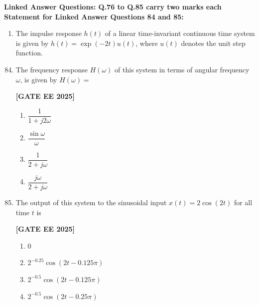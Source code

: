 \documentclass[12pt]{article}
\begin{document}
\vspace{1em}
 \large \textbf {Linked Answer Questions: Q.76 to Q.85 carry two marks each}
 \large \textbf {Statement for Linked Answer Questions 84 and 85: }
\vspace{1em}
\begin{enumerate}
\item The impulse response $h(t)$ of a linear time-invariant continuous time system is given by
$h(t) = \exp(-2 t) u(t)$, where $u(t)$ denotes the unit step function.
\end{enumerate}
\begin{enumerate}[leftmargin=*, label=\textbf{Q.\arabic*:}]
\setcounter{enumi}{83}

\item The frequency response $H(\omega)$ of this system in terms of angular frequency $\omega$, is given by $H(\omega) = $
 
\noindent \textbf{[GATE EE 2025]}
\begin{enumerate}[label=(\Alph*)]
  \item $\dfrac{1}{1 + j2\omega}$
  \item $\dfrac{\sin \omega}{\omega}$
  \item $\dfrac{1}{2 + j\omega}$
  \item $\dfrac{j\omega}{2 + j\omega}$
\end{enumerate}

\item The output of this system to the sinusoidal input $x(t) = 2 \cos (2t)$ for all time $t$ is
 
\noindent \textbf{[GATE EE 2025]}
\begin{enumerate}[label=(\Alph*)]
  \item $0$
  \item $2^{-0.25} \cos (2t - 0.125\pi)$
  \item $2^{-0.5} \cos (2t - 0.125\pi)$
  \item $2^{-0.5} \cos (2t - 0.25\pi)$
\end{enumerate}

\end{enumerate}
\end{document}
